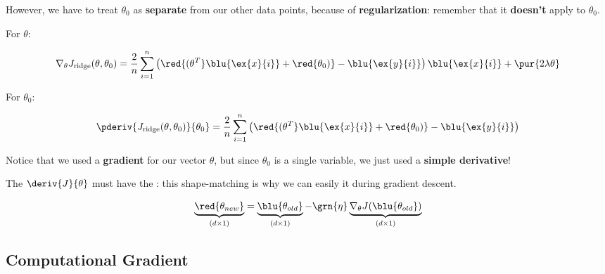         However, we have to treat $\theta_0$ as \textbf{separate} from our other data points, because of \textbf{regularization}: remember that it \textbf{doesn't} apply to $\theta_0$.
        
        For $\theta$:
        
        \begin{equation}
            \nabla_\theta J_\text{ridge}(\theta, \theta_0)
            =
            \frac{2}{n}\sum_{i=1}^n
            \left(
                \red{(\theta^T} \blu{\ex{x}{i}} + \red{\theta_0)}
                - 
                \blu{\ex{y}{i}}
            \right)
            \blu{\ex{x}{i}}
            +
            \pur{2 \lambda \theta}
        \end{equation}
        
        For $\theta_0$:
        
        \begin{equation}
            \pderiv{J_\text{ridge}(\theta, \theta_0)}{\theta_0} 
            =
            \frac{2}{n}\sum_{i=1}^n
            \left(
                \red{(\theta^T} \blu{\ex{x}{i}} + \red{\theta_0)}
                - 
                \blu{\ex{y}{i}}
            \right)
        \end{equation}
        
        Notice that we used a \textbf{gradient} for our vector $\theta$, but since $\theta_0$ is a single variable, we just used a \textbf{simple derivative}!\\
        
        \begin{concept}
            The  $\deriv{J}{\theta}$ must have the : this shape-matching is why we can easily  it during gradient descent.
            
            \begin{equation*}
                \underbrace{
                    \red{ \theta_{new} } 
                }_{(d \times 1)}
                =  
                \underbrace{
                    \blu{ \theta_{old} } 
                }_{(d \times 1)}
                - \grn{ \eta } 
                \underbrace{
                    \nabla_\theta J ( \blu{ \theta_{old} } )
                }_{(d \times 1)}
            \end{equation*}
        \end{concept}
    
    \subsection{Computational Gradient}
    
